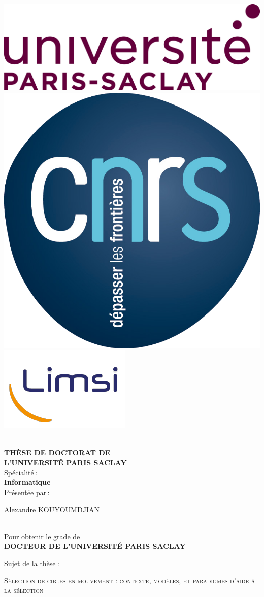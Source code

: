 \begin{titlepage}

\includegraphics[height=2.cm]{./figures/garde/logo_paris_saclay}\hfill
\includegraphics[height=2.cm]{./figures/garde/logo_CNRS}\hfill
\includegraphics[height=2.cm]{./figures/garde/limsilogo_new_transparent_crop}\hfill
\\
\\


\begin{center}
 \textbf{THÈSE DE DOCTORAT DE\\ L'UNIVERSITÉ PARIS SACLAY\\}
Spécialité\,:\\
\textbf{Informatique}\\ 
Présentée par\,:\\ 
\begin{LARGE}
Alexandre KOUYOUMDJIAN\end{LARGE}\\
Pour obtenir le grade de\\
\textbf{DOCTEUR DE L'UNIVERSITÉ PARIS SACLAY}
\end{center}

\noindent \underline{Sujet de la thèse :}\\
\begin{center}
\begin{Large}
{\textsc{Sélection de cibles en mouvement : contexte, modèles, et paradigmes d'aide à la sélection}}
\end{Large}
\end{center}


\end{titlepage}
